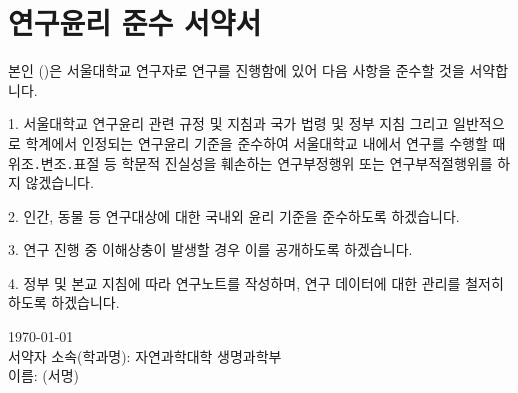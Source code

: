 \chapter*{연구윤리 준수 서약서}
\doublespacing
\makeatletter

본인 (\@author)은 서울대학교 연구자로 연구를 진행함에 있어 다음 사항을 준수할 것을 서약합니다.

1. 서울대학교 연구윤리 관련 규정 및 지침과 국가 법령 및 정부 지침 그리고 일반적으로 학계에서 인정되는 연구윤리 기준을 준수하여 서울대학교 내에서 연구를 수행할 때 위조․변조․표절 등 학문적 진실성을 훼손하는 연구부정행위 또는 연구부적절행위를 하지 않겠습니다.

2. 인간, 동물 등 연구대상에 대한 국내외 윤리 기준을 준수하도록 하겠습니다.

3. 연구 진행 중 이해상충이 발생할 경우 이를 공개하도록 하겠습니다.

4. 정부 및 본교 지침에 따라 연구노트를 작성하며, 연구 데이터에 대한 관리를 철저히 하도록 하겠습니다.

\begin{center}
  \today \\
  서약자 소속(학과명): 자연과학대학 생명과학부 \\
  이름: \quad \@author \quad (서명) \\
\end{center}
\makeatother
